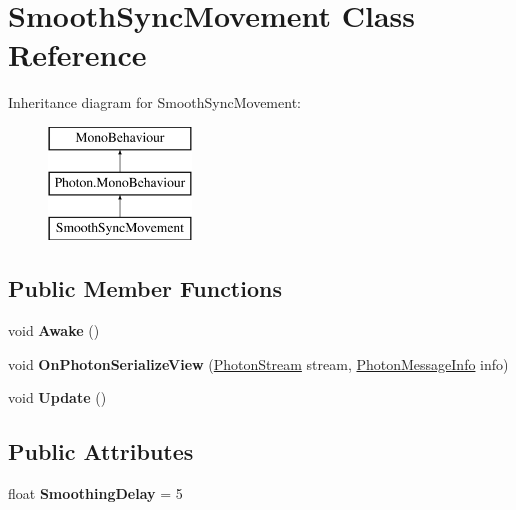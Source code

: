 \hypertarget{class_smooth_sync_movement}{}\section{Smooth\+Sync\+Movement Class Reference}
\label{class_smooth_sync_movement}
Inheritance diagram for Smooth\+Sync\+Movement\+:\begin{figure}[H]
\begin{center}
\leavevmode
\includegraphics[height=3.000000cm]{class_smooth_sync_movement}
\end{center}
\end{figure}
\subsection*{Public Member Functions}
\begin{DoxyCompactItemize}
\item 
void {\bfseries Awake} ()\hypertarget{class_smooth_sync_movement_a1570a4909f45a3070c9a07a4b38651ba}{}\label{class_smooth_sync_movement_a1570a4909f45a3070c9a07a4b38651ba}

\item 
void {\bfseries On\+Photon\+Serialize\+View} (\hyperlink{class_photon_stream}{Photon\+Stream} stream, \hyperlink{class_photon_message_info}{Photon\+Message\+Info} info)\hypertarget{class_smooth_sync_movement_add0f2ea4291a8c860fe0805938cbb357}{}\label{class_smooth_sync_movement_add0f2ea4291a8c860fe0805938cbb357}

\item 
void {\bfseries Update} ()\hypertarget{class_smooth_sync_movement_a28036023e2b4a53198bd908d77ad7350}{}\label{class_smooth_sync_movement_a28036023e2b4a53198bd908d77ad7350}

\end{DoxyCompactItemize}
\subsection*{Public Attributes}
\begin{DoxyCompactItemize}
\item 
float {\bfseries Smoothing\+Delay} = 5\hypertarget{class_smooth_sync_movement_ac60aea53989eca0129405cf300431f9d}{}\label{class_smooth_sync_movement_ac60aea53989eca0129405cf300431f9d}

\end{DoxyCompactItemize}
